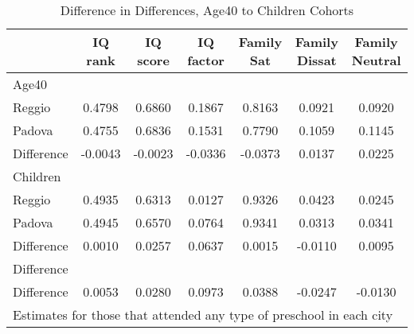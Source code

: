 \begin{table}[htbp]\centering
\caption{Difference in Differences, Age40 to Children Cohorts}
\begin{tabular}{l*{6}{c}}
\hline\hline
            &     IQ rank&    IQ score&   IQ factor&  Family Sat&Family Dissat&Family Neutral\\
\hline
Age40       &            &            &            &            &            &            \\
Reggio      &      0.4798&      0.6860&      0.1867&      0.8163&      0.0921&      0.0920\\
Padova      &      0.4755&      0.6836&      0.1531&      0.7790&      0.1059&      0.1145\\
Difference  &     -0.0043&     -0.0023&     -0.0336&     -0.0373&      0.0137&      0.0225\\
\hline
Children    &            &            &            &            &            &            \\
Reggio      &      0.4935&      0.6313&      0.0127&      0.9326&      0.0423&      0.0245\\
Padova      &      0.4945&      0.6570&      0.0764&      0.9341&      0.0313&      0.0341\\
Difference  &      0.0010&      0.0257&      0.0637&      0.0015&     -0.0110&      0.0095\\
\hline
Difference  &            &            &            &            &            &            \\
Difference  &      0.0053&      0.0280&      0.0973&      0.0388&     -0.0247&     -0.0130\\
\hline\hline
\multicolumn{7}{l}{\footnotesize Estimates for those that attended any type of preschool in each city}\\
\end{tabular}
\end{table}
